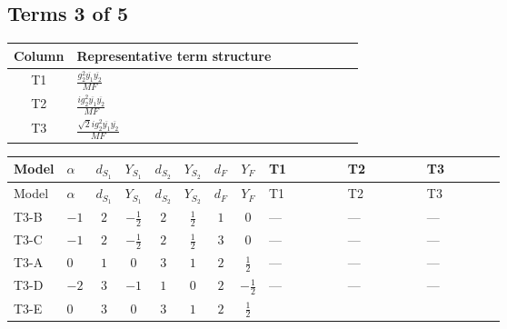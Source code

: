 \documentclass[8pt]{article}
\begin{document}
\begin{landscape}
\subsection*{Terms 3 of 5}
\begin{center}
\begin{tabular}{@{}c >{\raggedright\arraybackslash}p{0.82\linewidth}@{}}
\toprule
Column & Representative term structure \\
\midrule
T1 & \(\displaystyle \frac{g_{2}^{2} \overline{y_{1}} \overline{y_{2}}}{MF}\) \\
\midrule
T2 & \(\displaystyle \frac{i g_{2}^{2} \overline{y_{1}} \overline{y_{2}}}{MF}\) \\
\midrule
T3 & \(\displaystyle \frac{\sqrt{2} i g_{2}^{2} \overline{y_{1}} \overline{y_{2}}}{MF}\) \\
\midrule
\bottomrule
\end{tabular}
\end{center}
\smallskip
\tiny
\begin{longtable}{@{}llcccccc >{\raggedright\arraybackslash}p{0.21\linewidth} >{\raggedright\arraybackslash}p{0.21\linewidth} >{\raggedright\arraybackslash}p{0.21\linewidth}@{}}
\toprule
Model & $\alpha$ & $d_{S_1}$ & $Y_{S_1}$ & $d_{S_2}$ & $Y_{S_2}$ & $d_F$ & $Y_F$ & T1 & T2 & T3 \\
\midrule
\endfirsthead
\toprule
Model & $\alpha$ & $d_{S_1}$ & $Y_{S_1}$ & $d_{S_2}$ & $Y_{S_2}$ & $d_F$ & $Y_F$ & T1 & T2 & T3 \\
\midrule
\endhead
T3-B & $-1$ & $2$ & $-\frac{1}{2}$ & $2$ & $\frac{1}{2}$ & $1$ & $0$ & --- & --- & --- \\
\midrule
T3-C & $-1$ & $2$ & $-\frac{1}{2}$ & $2$ & $\frac{1}{2}$ & $3$ & $0$ & --- & --- & --- \\
\midrule
T3-A & $0$ & $1$ & $0$ & $3$ & $1$ & $2$ & $\frac{1}{2}$ & --- & --- & --- \\
\midrule
T3-D & $-2$ & $3$ & $-1$ & $1$ & $0$ & $2$ & $-\frac{1}{2}$ & --- & --- & --- \\
\midrule
T3-E & $0$ & $3$ & $0$ & $3$ & $1$ & $2$ & $\frac{1}{2}$ & \scriptsize\adjustbox{max width=\linewidth}{$\begin{gathered} - \frac{g_{2}^{2} \overline{y_{1}} \overline{y_{2}}}{2 MF}\end{gathered}$} & \scriptsize\adjustbox{max width=\linewidth}{$\begin{gathered} - \frac{i g_{2}^{2} \overline{y_{1}} \overline{y_{2}}}{2 MF}\end{gathered}$} & \scriptsize\adjustbox{max width=\linewidth}{$\begin{gathered} - \frac{45 \sqrt{2} i g_{2}^{2} \overline{y_{1}} \overline{y_{2}}}{16 MF}\end{gathered}$} \\
\midrule
\bottomrule
\end{longtable}
\clearpage

\end{landscape}
\end{document}

